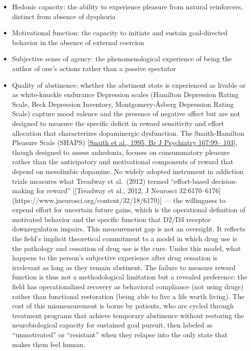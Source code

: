 \begin{itemize}
\tightlist
\item
  Hedonic capacity: the ability to experience pleasure from natural reinforcers, distinct from absence of dysphoria\\
\item
  Motivational function: the capacity to initiate and sustain goal-directed behavior in the absence of external coercion\\
\item
  Subjective sense of agency: the phenomenological experience of being the author of one's actions rather than a passive spectator\\
\item
  Quality of abstinence: whether the abstinent state is experienced as livable or as white-knuckle endurance Depression scales (Hamilton Depression Rating Scale, Beck Depression Inventory, Montgomery-Åsberg Depression Rating Scale) capture mood valence and the presence of negative affect but are not designed to measure the specific deficit in reward sensitivity and effort allocation that characterizes dopaminergic dysfunction. The Snaith-Hamilton Pleasure Scale (SHAPS) {[}\href{https://pubmed.ncbi.nlm.nih.gov/7551619/}{Snaith et al., 1995, Br J Psychiatry 167:99-- 103}{]}, though designed to assess anhedonia, focuses on consummatory pleasure rather than the anticipatory and motivational components of reward that depend on mesolimbic dopamine. No widely adopted instrument in addiction trials measures what Treadway et al.~(2012) termed ``effort-based decision-making for reward'' {[}{[}Treadway et al., 2012, J Neurosci 32:6170--6176{]} (https://www.jneurosci.org/content/32/18/6170){]} --- the willingness to expend effort for uncertain future gains, which is the operational definition of motivated behavior and the specific function that D2/D3 receptor downregulation impairs. This measurement gap is not an oversight. It reflects the field's implicit theoretical commitment to a model in which drug use is the pathology and cessation of drug use is the cure. Under this model, what happens to the person's subjective experience after drug cessation is irrelevant as long as they remain abstinent. The failure to measure reward function is thus not a methodological limitation but a revealed preference: the field has operationalized recovery as behavioral compliance (not using drugs) rather than functional restoration (being able to live a life worth living). The cost of this mismeasurement is borne by patients, who are cycled through treatment programs that achieve temporary abstinence without restoring the neurobiological capacity for sustained goal pursuit, then labeled as ``unmotivated'' or ``resistant'' when they relapse into the only state that makes them feel human.
\end{itemize}

